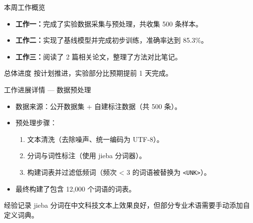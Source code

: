 \documentclass[aspectratio=169]{beamer}
\begin{document}
\begin{frame}{本周工作概览}
  \begin{itemize}
    \item \textbf{工作一：}完成了实验数据采集与预处理，共收集 500 条样本。
    \item \textbf{工作二：}实现了基线模型并完成初步训练，准确率达到 85.3\%。
    \item \textbf{工作三：}阅读了 2 篇相关论文，整理了方法对比笔记。
  \end{itemize}

  \vspace{1em}
  \begin{block}{总体进度}
    按计划推进，实验部分比预期提前 1 天完成。
  \end{block}
\end{frame}


\begin{frame}{工作进展详情 — 数据预处理}
  \begin{itemize}
    \item 数据来源：公开数据集 + 自建标注数据（共 500 条）。
    \item 预处理步骤：
      \begin{enumerate}
        \item 文本清洗（去除噪声、统一编码为 UTF-8）。
        \item 分词与词性标注（使用 jieba 分词器）。
        \item 构建词表并过滤低频词（频次 < 3 的词语被替换为 \texttt{<UNK>}）。
      \end{enumerate}
    \item 最终构建了包含 12,000 个词语的词表。
  \end{itemize}

  \begin{exampleblock}{经验记录}
    jieba 分词在中文科技文本上效果良好，但部分专业术语需要手动添加自定义词典。
  \end{exampleblock}
\end{frame}
\end{document}
